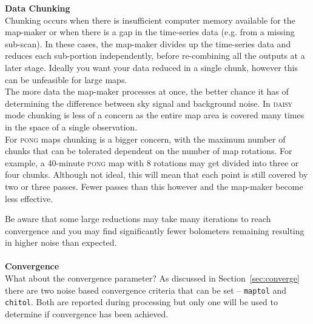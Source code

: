 \documentclass[twoside,11pt]{article}
\newcommand{\htmlref}[2]{#1}
\newenvironment{latexonly}{}{}
\newcommand{\latexhtml}[2]{#1}
\renewcommand{\_}{\texttt{\symbol{95}}}
\newenvironment{fmpage}[1]{\begin{lrbox}{\fmbox}\begin{minipage}{#1}}{\end{minipage}\end{lrbox}\fbox{\usebox{\fmbox}}}
\newcommand{\cref}[3]{\latexhtml{#1~\ref{#2}}{\htmlref{#3}{#2}}}
\begin{document}
\begin{latexonly}
\begin{center}
\begin{fmpage}{0.92\linewidth}
\label{page:text}
\begin{minipage}[t]{0.025\linewidth}
\hspace{0.1cm}
\end{minipage}
\begin{minipage}[t]{0.93\linewidth}
\vspace{0.2cm}
\textbf{Data Chunking}\\
Chunking occurs when there is insufficient computer memory available
for the map-maker or when there is a gap in the time-series data (e.g.
from a missing sub-scan). In these cases, the map-maker divides up the
time-series data and reduces each sub-portion independently, before
re-combining all the outputs at a later stage. Ideally you want your
data reduced in a single chunk, however this can be unfeasible for
large maps.
\vspace{0.2cm}\\
The more data the map-maker processes at once, the better chance it
has of determining the difference between sky signal and background
noise. In \textsc{daisy} mode chunking is less of a concern as
the entire map area is covered many times in the space of a single
observation.
\vspace{0.2cm}\\
For \textsc{pong} maps chunking is a bigger concern, with the
maximum number of chunks that can be tolerated dependent on the number
of map rotations. For example, a 40-minute \textsc{pong} map with 8
rotations may get divided into three or four chunks. Although not
ideal, this will mean that each point is still covered by two or three
passes. Fewer passes than this however and the map-maker become less
effective.
\vspace{0.2cm}
\end{minipage}
\begin{minipage}[t]{0.025\linewidth}
\hspace{0.1cm}
\end{minipage}
\end{fmpage}
\end{center}
\end{latexonly}

Be aware that some large reductions may take many iterations to reach
convergence and you may find significantly fewer bolometers remaining
resulting in higher noise than expected.
\\ \\
\textbf{Convergence}\\
What about the convergence parameter? As discussed in
\cref{Section}{sec:converge}{Convergence} there are two noise based
convergence criteria that can be set -- \texttt{maptol} and \texttt{chitol}. Both
are reported during processing but only one will be used to determine
if convergence has been achieved.
\end{document}
